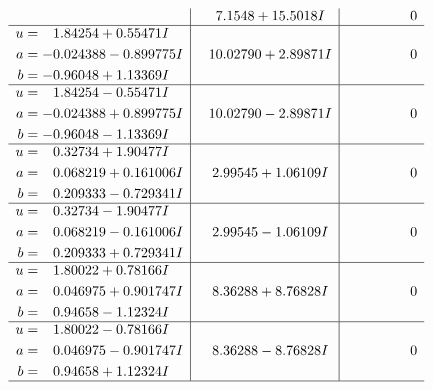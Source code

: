 \documentclass[1p]{elsarticle_modified}
\theoremstyle{definition}
\begin{document}
$$\begin{array}{c|c|c}
 & \phantom{-}7.1548 + 15.5018 I & \phantom{-0.000000 } 0 \\ \hline\begin{aligned}
u &= \phantom{-}1.84254 + 0.55471 I \\
a &= -0.024388 - 0.899775 I \\
b &= -0.96048 + 1.13369 I\end{aligned}
 & \phantom{-}10.02790 + 2.89871 I & \phantom{-0.000000 } 0 \\ \hline\begin{aligned}
u &= \phantom{-}1.84254 - 0.55471 I \\
a &= -0.024388 + 0.899775 I \\
b &= -0.96048 - 1.13369 I\end{aligned}
 & \phantom{-}10.02790 - 2.89871 I & \phantom{-0.000000 } 0 \\ \hline\begin{aligned}
u &= \phantom{-}0.32734 + 1.90477 I \\
a &= \phantom{-}0.068219 + 0.161006 I \\
b &= \phantom{-}0.209333 - 0.729341 I\end{aligned}
 & \phantom{-}2.99545 + 1.06109 I & \phantom{-0.000000 } 0 \\ \hline\begin{aligned}
u &= \phantom{-}0.32734 - 1.90477 I \\
a &= \phantom{-}0.068219 - 0.161006 I \\
b &= \phantom{-}0.209333 + 0.729341 I\end{aligned}
 & \phantom{-}2.99545 - 1.06109 I & \phantom{-0.000000 } 0 \\ \hline\begin{aligned}
u &= \phantom{-}1.80022 + 0.78166 I \\
a &= \phantom{-}0.046975 + 0.901747 I \\
b &= \phantom{-}0.94658 - 1.12324 I\end{aligned}
 & \phantom{-}8.36288 + 8.76828 I & \phantom{-0.000000 } 0 \\ \hline\begin{aligned}
u &= \phantom{-}1.80022 - 0.78166 I \\
a &= \phantom{-}0.046975 - 0.901747 I \\
b &= \phantom{-}0.94658 + 1.12324 I\end{aligned}
 & \phantom{-}8.36288 - 8.76828 I & \phantom{-0.000000 } 0\\
 \hline 
 \end{array}$$\newpage$$\begin{array}{c|c|c}  

\end{array}$$
\end{document}
